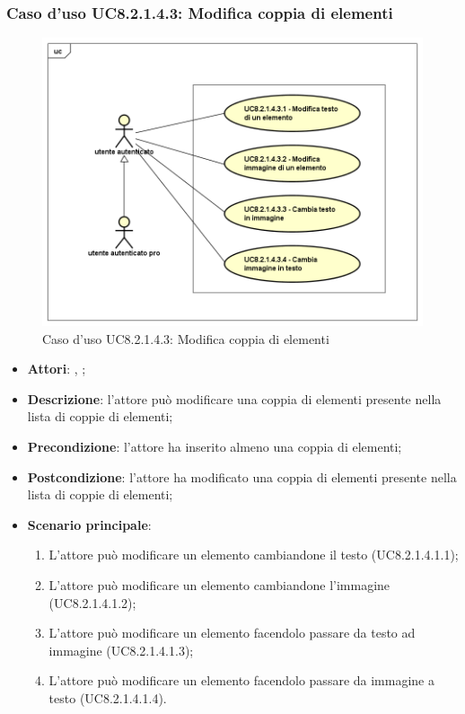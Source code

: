 	\subsubsection{Caso d'uso UC8.2.1.4.3: Modifica coppia di elementi}
	\label{UC8.2.1.4.3}
	\begin{figure}[h]
		\centering
		\includegraphics[scale=0.5,keepaspectratio]{UML/UC8_2_1_4_3.png}
		\caption{Caso d'uso UC8.2.1.4.3: Modifica coppia di elementi}
	\end{figure}
	\FloatBarrier
	\begin{itemize}
		\item \textbf{Attori}: \uau, \uaupro;
		\item \textbf{Descrizione}: l'attore può modificare una coppia di elementi presente nella lista di coppie di elementi;
		\item \textbf{Precondizione}: l'attore ha inserito almeno una coppia di elementi;
		\item \textbf{Postcondizione}: l'attore ha modificato una coppia di elementi presente nella lista di coppie di elementi; 
		\item \textbf{Scenario principale}: 
		\begin{enumerate}
			\item L'attore può modificare un elemento cambiandone il testo (UC8.2.1.4.1.1);
			\item L'attore può modificare un elemento cambiandone l'immagine (UC8.2.1.4.1.2);
			\item L'attore può modificare un elemento facendolo passare da testo ad immagine (UC8.2.1.4.1.3);
			\item L'attore può modificare un elemento facendolo passare da immagine a testo (UC8.2.1.4.1.4).	
		\end{enumerate}
	\end{itemize}
	
